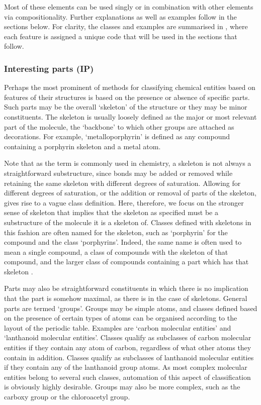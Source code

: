 \documentclass[10pt]{bmc_article}
\newenvironment{bmcformat}{\baselineskip20pt\sloppy\setboolean{publ}{false}}{\baselineskip20pt\sloppy}
\begin{document}
\begin{bmcformat}
Most of these elements can be used singly or in combination with other elements via compositionality.  Further explanations as well as examples follow in the sections below. For clarity, the classes and examples are summarised in \textit{}, where each feature is assigned a unique code that will be used in the sections that follow.

\subsubsection*{Interesting parts (IP)}

Perhaps the most prominent of methods for classifying chemical entities based on features of their structures is based on the presence or absence of specific parts.  Such parts may be the overall `skeleton' of the structure or they may be minor constituents. The skeleton is usually loosely defined as the major or most relevant part of the molecule, the `backbone' to which other groups are attached as decorations. For example, `metalloporphyrin' is defined as any compound containing a porphyrin skeleton and a metal atom.  

Note that as the term is commonly used in chemistry, a skeleton is not always a straightforward substructure, since bonds may be added or removed while retaining the same skeleton with different degrees of saturation. Allowing for different degrees of saturation, or the addition or removal of parts of the skeleton, gives rise to a vague class definition. Here, therefore, we focus on the stronger sense of skeleton that implies that the skeleton as specified must be a substructure of the molecule it is a skeleton of. Classes defined with skeletons in this fashion are often named for the skeleton, such as `porphyrin' for the compound and the class `porphyrins'. Indeed, the same name is often used to mean a single compound, a class of compounds with the skeleton of that compound, and the larger class of compounds containing a part which has that skeleton \cite{corbett2008}. 

Parts may also be straightforward constituents in which there is no implication that the part is somehow maximal, as there is in the case of skeletons.  General parts are termed `groups'. Groups may be simple atoms, and classes defined based on the presence of certain types of atoms can be organised according to the layout of the periodic table.  Examples are `carbon molecular entities' and `lanthanoid molecular entities'. Classes qualify as subclasses of carbon molecular entities if they contain any atom of carbon, regardless of what other atoms they contain in addition.  Classes qualify as subclasses of lanthanoid molecular entities if they contain any of the lanthanoid group atoms.  As most complex molecular entities belong to several such classes, automation of this aspect of classification is obviously highly desirable. Groups may also be more complex, such as the carboxy group or the chloroacetyl group. 


\end{bmcformat}
\end{document}
